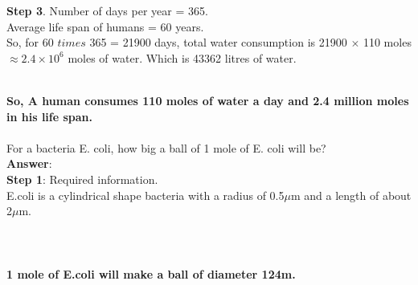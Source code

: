 \documentclass[11pt]{exam}
\begin{document}
\begin{questions}
{\begin{minipage}{38em}
\textbf{Step 3}. Number of days per year = 365. \\
 Average life span of humans = 60 years. \\
So, for 60 $times$ 365 = 21900 days, total water consumption is 21900 $\times$ 110 moles $\approx 2.4\times10^{6}$ moles of water. Which is 43362 litres of water.

\end{minipage}} \\ 

\textbf{So, A human consumes 110 moles of water a day and 2.4 million moles in his life span.}                \\ \\


\question
\label{Q12:E.coli}
For a bacteria E. coli, how big a ball of 1 mole of E. coli will be? \\
\textbf{Answer}:\\
\textbf{Step 1}: Required information. \\
                E.coli is a cylindrical shape bacteria with a radius of 0.5$\mu$m and a length of about 2$\mu$m. \\ \\
 \\ \\
                 \textbf{1 mole of E.coli will make a ball of diameter 124m.}\\ \\ \\ \\ \\ \\ \\ \\ \\


\end{questions}
\end{document}
